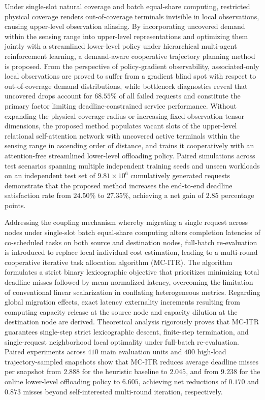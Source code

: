 \begin{abstract*}
Under single-slot natural coverage and batch equal-share computing, restricted physical coverage renders out-of-coverage terminals invisible in local observations, causing upper-level observation aliasing. By incorporating uncovered demand within the sensing range into upper-level representations and optimizing them jointly with a streamlined lower-level policy under hierarchical multi-agent reinforcement learning, a demand-aware cooperative trajectory planning method is proposed. From the perspective of policy-gradient observability, associated-only local observations are proved to suffer from a gradient blind spot with respect to out-of-coverage demand distributions, while bottleneck diagnostics reveal that uncovered drops account for $68.55\%$ of all failed requests and constitute the primary factor limiting deadline-constrained service performance. Without expanding the physical coverage radius or increasing fixed observation tensor dimensions, the proposed method populates vacant slots of the upper-level relational self-attention network with uncovered active terminals within the sensing range in ascending order of distance, and trains it cooperatively with an attention-free streamlined lower-level offloading policy. Paired simulations across test scenarios spanning multiple independent training seeds and unseen workloads on an independent test set of $9.81\times 10^6$ cumulatively generated requests demonstrate that the proposed method increases the end-to-end deadline satisfaction rate from $24.50\%$ to $27.35\%$, achieving a net gain of $2.85$ percentage points.

Addressing the coupling mechanism whereby migrating a single request across nodes under single-slot batch equal-share computing alters completion latencies of co-scheduled tasks on both source and destination nodes, full-batch re-evaluation is introduced to replace local individual cost estimation, leading to a multi-round cooperative iterative task allocation algorithm (MC-ITR). The algorithm formulates a strict binary lexicographic objective that prioritizes minimizing total deadline misses followed by mean normalized latency, overcoming the limitation of conventional linear scalarization in conflating heterogeneous metrics. Regarding global migration effects, exact latency externality increments resulting from computing capacity release at the source node and capacity dilution at the destination node are derived. Theoretical analysis rigorously proves that MC-ITR guarantees single-step strict lexicographic descent, finite-step termination, and single-request neighborhood local optimality under full-batch re-evaluation. Paired experiments across $410$ main evaluation units and $400$ high-load trajectory-sampled snapshots show that MC-ITR reduces average deadline misses per snapshot from $2.888$ for the heuristic baseline to $2.045$, and from $9.238$ for the online lower-level offloading policy to $6.605$, achieving net reductions of $0.170$ and $0.873$ misses beyond self-interested multi-round iteration, respectively.


\end{abstract*}
